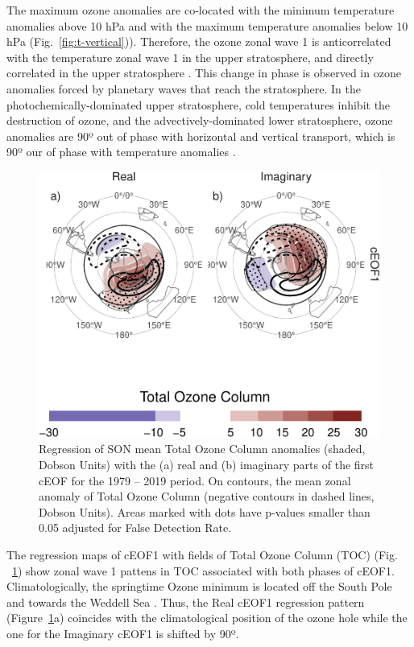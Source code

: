\documentclass[smallextended]{svjour3}       %
\begin{document}
The maximum ozone anomalies are co-located with the minimum temperature anomalies above 10 hPa and with the maximum temperature anomalies below 10 hPa (Fig.~\ref{fig:t-vertical})). Therefore, the ozone zonal wave 1 is anticorrelated with the temperature zonal wave 1 in the upper stratosphere, and directly correlated in the upper stratosphere . This change in phase is observed in ozone anomalies forced by planetary waves that reach the stratosphere. In the photochemically-dominated upper stratosphere, cold temperatures inhibit the destruction of ozone, and the advectively-dominated lower stratosphere, ozone anomalies are 90º out of phase with horizontal and vertical transport, which is 90º our of phase with temperature anomalies \citep{hartmann1979, wirth1993, smith1995}.





\begin{figure}
\centering
\includegraphics{../figures/o3-regr-1.pdf}
\caption{\label{fig:o3-regr}Regression of SON mean Total Ozone Column anomalies (shaded, Dobson Units) with the (a) real and (b) imaginary parts of the first cEOF for the 1979 -- 2019 period.
On contours, the mean zonal anomaly of Total Ozone Column (negative contours in dashed lines, Dobson Units).
Areas marked with dots have p-values smaller than 0.05 adjusted for False Detection Rate.}
\end{figure}

The regression maps of cEOF1 with fields of Total Ozone Column (TOC) (Fig. ~\ref{fig:o3-regr}) show zonal wave 1 pattens in TOC associated with both phases of cEOF1. Climatologically, the springtime Ozone minimum is located off the South Pole and towards the Weddell Sea \citep{grytsai2011}.
Thus, the Real cEOF1 regression pattern (Figure~\ref{fig:o3-regr}a) coincides with the climatological position of the ozone hole while the one for the Imaginary cEOF1 is shifted by 90º.
\end{document}
